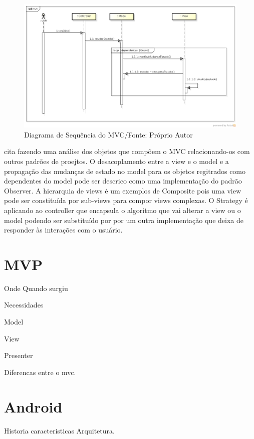 \begin{figure}[h]
	\centering
	\includegraphics[scale=0.5]{img/mvc_seq.png}
	\caption{Diagrama de Sequência do MVC/Fonte: Próprio Autor}
	\label{mvc_seq}
\end{figure}

 cita  fazendo uma análise dos
objetos que compõem o MVC relacionando-os com outros padrões de proejtos. O
desacoplamento entre a view e o model e a propagação das mudanças de estado no
model para os objetos regitrados como dependentes do model pode ser descrico
como uma implementação do padrão Observer. A hierarquia de views é um exemplos
de Composite pois uma view pode ser constituída por sub-views para compor views
complexas. O Strategy é aplicando ao controller que encapsula o algoritmo que
vai alterar a view ou o model podendo ser substituído por por um outra
implementação que deixa de responder às interações com o usuário.




\section*{MVP}

Onde Quando surgiu

Necessidades 

Model

View 

Presenter

Diferencas entre o mvc.

\section*{Android}
 
Historia caracteristicas
Arquitetura.


